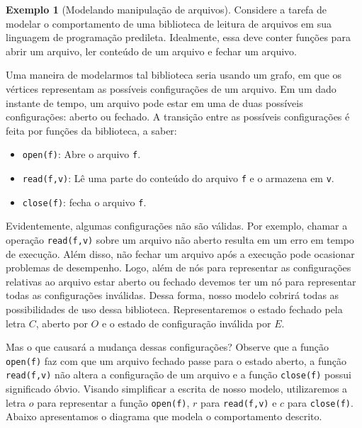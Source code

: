 \documentclass[a4paper]{article}
\theoremstyle{definition}
\newtheorem{Example}{Exemplo}
\begin{document}
  \begin{Example}[Modelando manipulação de arquivos]
    Considere a tarefa de modelar o comportamento de uma biblioteca de leitura
    de arquivos em sua linguagem de programação predileta. Idealmente, essa
    deve conter funções para abrir um arquivo, ler conteúdo de um arquivo e
    fechar um arquivo.

    Uma maneira de modelarmos tal biblioteca seria usando um grafo, em que
    os vértices representam as possíveis configurações de um arquivo. Em
    um dado instante de tempo, um arquivo pode estar em uma de duas possíveis
    configurações: aberto ou fechado. A transição entre as possíveis
    configurações é feita por funções da biblioteca, a saber:
    \begin{itemize}
       \item \verb|open(f)|: Abre o arquivo \verb|f|.
       \item \verb|read(f,v)|: Lê uma parte do conteúdo do arquivo \verb|f|
         e o armazena em \verb|v|.
       \item \verb|close(f)|: fecha o arquivo \verb|f|.
    \end{itemize}
    Evidentemente, algumas configurações não são válidas. Por exemplo,
    chamar a operação \verb|read(f,v)| sobre um arquivo não aberto resulta
    em um erro em tempo de execução. Além disso, não fechar um arquivo após
    a execução pode ocasionar problemas de desempenho. Logo, além de nós para
    representar as configurações relativas ao arquivo estar aberto ou fechado
    devemos ter um nó para representar todas as configurações inválidas.
    Dessa forma, nosso modelo cobrirá todas as possibilidades de uso dessa
    biblioteca. Representaremos o estado fechado pela letra $C$, aberto por $O$
    e o estado de configuração inválida por $E$.

    Mas o que causará a mudança dessas configurações? Observe que a função
    \verb|open(f)| faz com que um arquivo fechado passe para o estado aberto,
    a função \verb|read(f,v)| não altera a configuração de um arquivo e
    a função \verb|close(f)| possui significado óbvio. Visando simplificar
    a escrita de nosso modelo, utilizaremos a letra $o$ para representar
    a função \verb|open(f)|, $r$ para \verb|read(f,v)| e $c$ para
    \verb|close(f)|. Abaixo apresentamos o diagrama que modela o
    comportamento descrito.
    \begin{figure}[ht]
\end{figure}
\end{Example}
\end{document}
